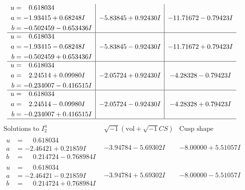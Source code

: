 \documentclass[1p]{elsarticle_modified}
\theoremstyle{definition}
\newcommand{\I}{\sqrt{-1}}
\begin{document}
$$\begin{array}{c|c|c}
\begin{aligned}
u &= \phantom{-}0.618034\phantom{ +0.000000I} \\
a &= -1.93415 + 0.68248 I \\
b &= -0.502459 - 0.653436 I\end{aligned}
 & -5.83845 + 0.92430 I & -11.71672 - 0.79423 I \\ \hline\begin{aligned}
u &= \phantom{-}0.618034\phantom{ +0.000000I} \\
a &= -1.93415 - 0.68248 I \\
b &= -0.502459 + 0.653436 I\end{aligned}
 & -5.83845 - 0.92430 I & -11.71672 + 0.79423 I \\ \hline\begin{aligned}
u &= \phantom{-}0.618034\phantom{ +0.000000I} \\
a &= \phantom{-}2.24514 + 0.09980 I \\
b &= -0.234007 - 0.416515 I\end{aligned}
 & -2.05724 + 0.92430 I & -4.28328 - 0.79423 I \\ \hline\begin{aligned}
u &= \phantom{-}0.618034\phantom{ +0.000000I} \\
a &= \phantom{-}2.24514 - 0.09980 I \\
b &= -0.234007 + 0.416515 I\end{aligned}
 & -2.05724 - 0.92430 I & -4.28328 + 0.79423 I\\
 \hline 
 \end{array}$$\newpage$$\begin{array}{c|c|c}  
\text{Solutions to }I^u_{2}& \I (\text{vol} + \sqrt{-1}CS) & \text{Cusp shape}\\
 \hline 
\begin{aligned}
u &= \phantom{-}0.618034\phantom{ +0.000000I} \\
a &= -2.46421 + 0.21859 I \\
b &= \phantom{-}0.214724 - 0.768984 I\end{aligned}
 & -3.94784 - 5.69302 I & -8.00000 + 5.51057 I \\ \hline\begin{aligned}
u &= \phantom{-}0.618034\phantom{ +0.000000I} \\
a &= -2.46421 - 0.21859 I \\
b &= \phantom{-}0.214724 + 0.768984 I\end{aligned}
 & -3.94784 + 5.69302 I & -8.00000 - 5.51057 I \\ \hline\begin{aligned}

\end{aligned}
\end{array}$$
\end{document}

